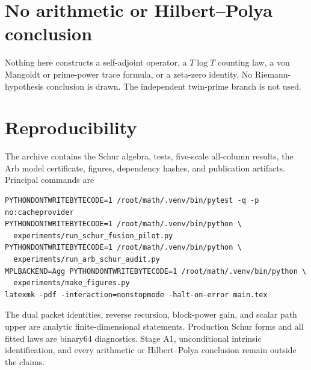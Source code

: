 \documentclass[11pt]{article}
\theoremstyle{remark}
\begin{document}
\section{No arithmetic or Hilbert--Polya conclusion}

Nothing here constructs a self-adjoint operator, a $T\log T$ counting law, a
von Mangoldt or prime-power trace formula, or a zeta-zero identity.  No
Riemann-hypothesis conclusion is drawn.  The independent twin-prime branch is
not used.

\section{Reproducibility}

The archive contains the Schur algebra, tests, five-scale all-column results,
the Arb model certificate, figures, dependency hashes, and publication
artifacts.  Principal commands are
\begin{verbatim}
PYTHONDONTWRITEBYTECODE=1 /root/math/.venv/bin/pytest -q -p no:cacheprovider
PYTHONDONTWRITEBYTECODE=1 /root/math/.venv/bin/python \
  experiments/run_schur_fusion_pilot.py
PYTHONDONTWRITEBYTECODE=1 /root/math/.venv/bin/python \
  experiments/run_arb_schur_audit.py
MPLBACKEND=Agg PYTHONDONTWRITEBYTECODE=1 /root/math/.venv/bin/python \
  experiments/make_figures.py
latexmk -pdf -interaction=nonstopmode -halt-on-error main.tex
\end{verbatim}

The dual packet identities, reverse recursion, block-power gain, and scalar
path upper are analytic finite-dimensional statements.  Production Schur
forms and all fitted laws are binary64 diagnostics.  Stage A1, unconditional
intrinsic identification, and every arithmetic or Hilbert--Polya conclusion
remain outside the claims.



\end{document}
